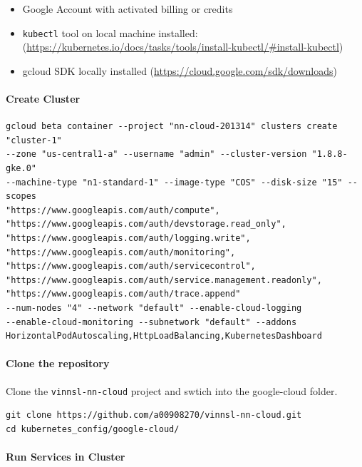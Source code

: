 \begin{itemize}
\item
  Google Account with activated billing or credits
\item
  \texttt{kubectl} tool on local machine installed:
  (\url{https://kubernetes.io/docs/tasks/tools/install-kubectl/\#install-kubectl})
\item
  gcloud SDK locally installed
  (\url{https://cloud.google.com/sdk/downloads})
\end{itemize}

\paragraph{Create Cluster}\label{create-cluster}

\begin{verbatim}
gcloud beta container --project "nn-cloud-201314" clusters create "cluster-1" 
--zone "us-central1-a" --username "admin" --cluster-version "1.8.8-gke.0" 
--machine-type "n1-standard-1" --image-type "COS" --disk-size "15" --scopes 
"https://www.googleapis.com/auth/compute",
"https://www.googleapis.com/auth/devstorage.read_only",
"https://www.googleapis.com/auth/logging.write",
"https://www.googleapis.com/auth/monitoring",
"https://www.googleapis.com/auth/servicecontrol",
"https://www.googleapis.com/auth/service.management.readonly",
"https://www.googleapis.com/auth/trace.append" 
--num-nodes "4" --network "default" --enable-cloud-logging 
--enable-cloud-monitoring --subnetwork "default" --addons 
HorizontalPodAutoscaling,HttpLoadBalancing,KubernetesDashboard
\end{verbatim}

\paragraph{Clone the repository}\label{clone-the-repository}

Clone the \texttt{vinnsl-nn-cloud} project and swtich into the
google-cloud folder.

\begin{verbatim}
git clone https://github.com/a00908270/vinnsl-nn-cloud.git
cd kubernetes_config/google-cloud/
\end{verbatim}

\paragraph{Run Services in Cluster}\label{run-services-in-cluster-1}

